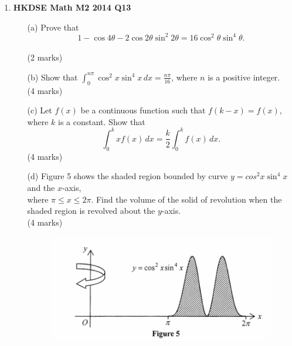 \documentclass{report}
\begin{document}
\begin{enumerate}
	\item \textbf{HKDSE Math M2 2014 Q13}
	\begin{enumerate}
		\item [(a)]Prove that $$1 - \cos{4\theta} - 2\cos{2\theta}\sin^2{2\theta} = 16\cos^2{\theta}\sin^4{\theta}.$$ \\(2 marks)
		\item [(b)]Show that $\displaystyle\int_{0}^{n\pi} \cos^2{x}\sin^4{x} \,dx = \displaystyle\frac{n\pi}{16}$, where $n$ is a positive integer.\\(4 marks)
		\item [(c)]Let $f(x)$ be a continuous function such that $f(k-x) = f(x)$, where $k$ is a constant. Show that $$\displaystyle\int_{0}^k xf(x)\, dx = \frac{k}{2} \int_{0}^k f(x) \,dx.$$
		(4 marks)
		\item [(d)]Figure 5 shows the shaded region bounded by curve $y = cos^2{x} \sin^4{x}$ and the $x$-axis, \\
		where $\pi \leq x \leq 2\pi$. Find the volume of the solid of revolution when the shaded region is revolved about the $y$-axis.\\
		(4 marks)
			\begin{figure}[H]
				\centering
				\includegraphics[width = .5\linewidth]{2014Figure5}
			\end{figure}
	\end{enumerate}

\end{enumerate}
\end{document}
